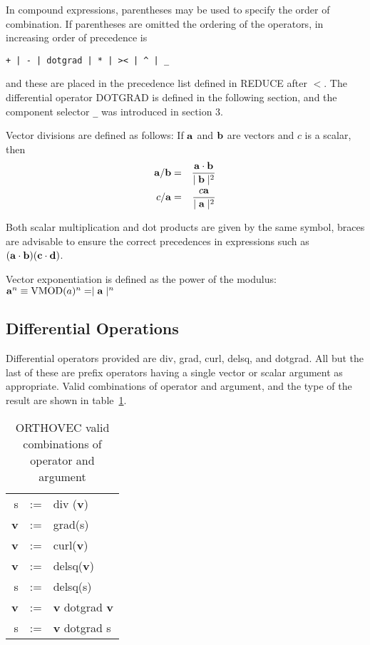 In compound expressions, parentheses may be used to specify the order of
combination.  If parentheses are omitted the ordering of the
operators, in increasing order of precedence is
\begin{verbatim}
+ | - | dotgrad | * | >< | ^ | _
\end{verbatim}
and these are placed in the precedence list defined in REDUCE
after $<$.
The differential operator DOTGRAD is defined in the 
following section, and the component selector {\tt \_} was introduced in
section 3.

Vector divisions are defined as follows:  If ${\bf a}$ and ${\bf b}$ are
vectors and $c$ is a scalar, then
\begin{eqnarray*}
{\bf a} /  {\bf b} & = &  \frac{{\bf a} \cdot {\bf b}}{  \mid {\bf b} 
\mid^2}\\
c / {\bf a}   & = &  \frac{c {\bf a}  }{ \mid {\bf a} \mid^2}
\end{eqnarray*}

Both scalar multiplication and dot products are given by the same symbol, 
braces are advisable to ensure the correct
precedences in expressions such as $({\bf a} \cdot {\bf b}) 
({\bf c} \cdot {\bf d})$.

Vector exponentiation is defined as the power of the modulus:\\
${\bf a}^n \equiv  {\rm VMOD}(a)^n =   \mid {\bf a} \mid^n$

\subsection{Differential Operations}
Differential operators provided are div, grad, curl, delsq, and dotgrad.
  
 
All but the last of these are prefix operators having a single
vector or scalar argument as appropriate.  Valid combinations of 
operator and argument, and the type of the result are shown in table~\ref{vvecttable}.


\begin{table}
\begin{center}
\begin{tabular}{rcl}
s & := & div ({\bf v})  \\
{\bf v} & := & grad(s) \\
{\bf v} & := & curl({\bf v})  \\
{\bf v} & := & delsq({\bf v}) \\
 s  & := & delsq(s) \\
{\bf v} & := & {\bf v}  dotgrad {\bf v}  \\
 s & := & {\bf v}  dotgrad  s 
\end{tabular}
\end{center}
\caption{ORTHOVEC valid combinations of operator and argument}\label{vvecttable}
\end{table}

